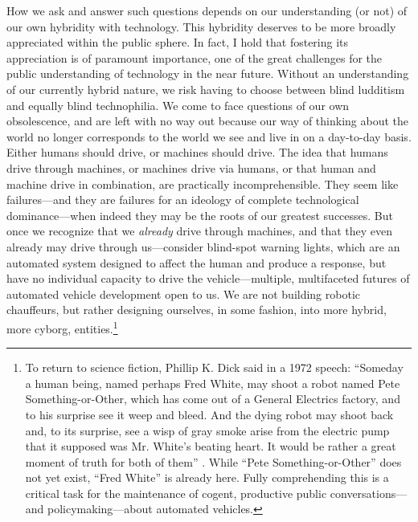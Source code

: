 How we ask and answer such questions depends on our understanding (or
not) of our own hybridity with technology. This hybridity deserves
to be more broadly appreciated within the public sphere. 
In fact, I hold that fostering its appreciation is of paramount
importance, one of the great challenges for the public understanding
of technology in the near future. Without an understanding of our
currently hybrid nature, we risk having to choose between blind ludditism
and equally blind technophilia. We come to face questions of our own
obsolescence, and are left with no way out because our way of thinking
about the world no longer corresponds to the world we see and live in
on a day-to-day basis. Either humans should drive, or machines should
drive. The idea that humans drive through machines, or machines drive
via humans, or that human and machine drive in combination, are
practically incomprehensible. They seem like failures---and they are
failures for an ideology of complete technological dominance---when
indeed they may be the roots of our greatest successes. But once we
recognize that we \emph{already} drive through machines, and that they
even already may drive through us---consider blind-spot
warning lights, which are an automated system designed to affect the
human and produce a response, but have no individual capacity to drive
the vehicle---multiple, multifaceted futures of automated vehicle
development open to us. We are not building robotic
chauffeurs, but rather designing ourselves, in some fashion, into more
hybrid, more cyborg, entities.\footnote{To return to science fiction, Phillip K. Dick said in
a 1972 speech: ``Someday a human being, named perhaps Fred White, may shoot a robot
named Pete Something-or-Other, which has come out of a General
Electrics factory, and to his surprise see it weep and bleed. And the
dying robot may shoot back and, to its surprise, see a wisp of gray
smoke arise from the electric pump that it supposed was Mr. White's
beating heart. It would be rather a great moment of truth for both of
them'' \cite{???-http://boingboing.net/2015/03/10/philip-k-dicks-androids-blu.html}.
While ``Pete Something-or-Other'' does not yet exist, ``Fred White''
is already here. Fully comprehending this is a critical task for the
maintenance of cogent, productive public conversations---and
policymaking---about automated vehicles.}


